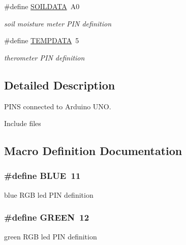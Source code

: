 \begin{DoxyCompactItemize}
\#define \hyperlink{group__const_ga867dc19b2b3ce4fcd0024f7c35a26c72}{S\+O\+I\+L\+D\+A\+TA}~A0
\begin{DoxyCompactList}\small\item\em soil moisture meter P\+IN definition \end{DoxyCompactList}\item 
\#define \hyperlink{group__const_gad85c50d1f6e8fb6bba261da3691fcb3f}{T\+E\+M\+P\+D\+A\+TA}~5
\begin{DoxyCompactList}\small\item\em therometer P\+IN definition \end{DoxyCompactList}\end{DoxyCompactItemize}


\subsection{Detailed Description}
P\+I\+NS connected to Arduino U\+NO. 

Include files 

\subsection{Macro Definition Documentation}
\subsubsection[{\texorpdfstring{B\+L\+UE}{BLUE}}]{\setlength{\rightskip}{0pt plus 5cm}\#define B\+L\+UE~11}\hypertarget{group__const_ga79d10e672abb49ad63eeaa8aaef57c38}{}\label{group__const_ga79d10e672abb49ad63eeaa8aaef57c38}


blue R\+GB led P\+IN definition 

\subsubsection[{\texorpdfstring{G\+R\+E\+EN}{GREEN}}]{\setlength{\rightskip}{0pt plus 5cm}\#define G\+R\+E\+EN~12}\hypertarget{group__const_gacfbc006ea433ad708fdee3e82996e721}{}\label{group__const_gacfbc006ea433ad708fdee3e82996e721}


green R\+GB led P\+IN definition 

